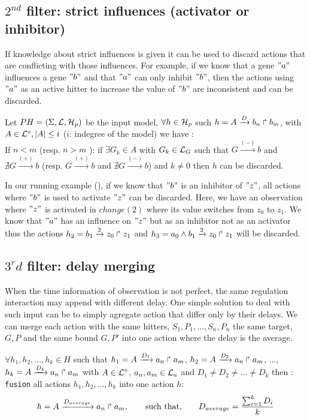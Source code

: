 \subsection{$2^{nd}$ filter: strict influences (activator or inhibitor)}

If knowledge about strict influences is given it can be used to discard actions that are conflicting with those influences.
For example, if we know that a gene $"a"$ influences a gene $"b"$ and that $"a"$ can only inhibit $"b"$, then the actions using $"a"$ as an active hitter to increase the value of $"b"$ are inconsistent and can be discarded.

\begin{definition}
Let $PH=(\Sigma,\mathcal{L},\mathcal{H}_p)$ be the input model, $\forall h \in \mathcal{H}_p$ such $h=A\xrightarrow{D} b_n \Rsh b_m$, with $ A \in \mathcal{L}^{\diamond}, | A| \leq i$ ($i$: indegree of the model) we have :\\
If $n < m$ (resp. $n > m$ ): if $\exists G_k \in A $ with $G_k \in \mathcal{L}_G $ such that $G \xrightarrow{(-)} b$ and $\nexists G \xrightarrow{(+)} b$ (resp. $G \xrightarrow{(+)} b$ and $\nexists G \xrightarrow{(-)} b$) and $k \neq 0$ then $h$ can be discarded.
\end{definition}

In our running example (), if we know that $"b"$ is an inhibitor of $"z"$, all actions where $"b"$ is used to activate $"z"$ can be discarded.
Here, we have an observation where $"z"$ is activated in $change(2)$ where its value switches from $z_0$ to $z_1$.
We know that $"a"$ has an influence on $"z"$ but as an inhibitor not as an activator thus the actions $h_2=b_1\xrightarrow{2} z_0 \Rsh z_1$ and $h_3=a_0 \wedge b_1 \xrightarrow{2} z_0 \Rsh z_1$ will be discarded.

\subsection{$3^rd$ filter: delay merging}

When the time information of observation is not perfect, the same regulation interaction may append with different delay.
One simple solution to deal with such input can be to simply agregate action that differ only by their delays.
We can merge each action with the same hitters, $S_1,P_1,\ldots, S_n,P_n$ the same target, $G, P$ and the same bound $G, P'$ into one action where the delay is the average.

\begin{definition}
$\forall h_1, h_2,..., h_k \in H$ such that $h_1=A\xrightarrow{D_1} a_n \Rsh a_m$, $h_2=A\xrightarrow{D_2} a_n \Rsh a_m$, ..., $h_k=A\xrightarrow{D_k} a_n \Rsh a_m$ with $ A \in \mathcal{L}^{\diamond}$, $a_n, a_m \in \mathcal{L}_a$ and $D_1 \neq D_2 \neq ... \neq D_k$ then : \\
\texttt{fusion} all actions $h_1, h_2,..., h_k$ into one action $h$: $$h=A\xrightarrow{D_{average}} a_n \Rsh a_m, \hspace{0.7cm} \text{such that,} \hspace{0.7cm} D_{average} = \frac{\sum_{i=1}^k D_{i}}{k} $$
\end{definition}

